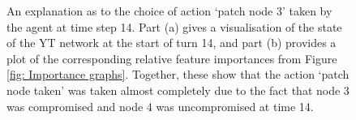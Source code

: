 \documentclass{article}
\begin{document}
\begin{figure}

\centering


\centering


    \caption{An explanation as to the choice of action `patch node 3' taken by the agent at time step 14. Part (a) gives a visualisation of the state of the YT network at the start of turn 14, and part (b) provides a plot of the corresponding relative feature importances from Figure \ref{fig: Importance graphs}. Together, these show that the action `patch node taken' was taken almost completely due to the fact that node 3 was compromised and node 4 was uncompromised at time 14.}
    \label{fig: state_14}
\end{figure} 
\end{document}
